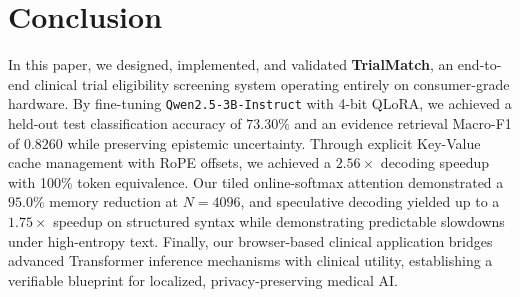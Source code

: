 \documentclass[conference]{IEEEtran}
\begin{document}
\section{Conclusion}
\label{sec:conclusion}

In this paper, we designed, implemented, and validated \textbf{TrialMatch}, an end-to-end clinical trial eligibility screening system operating entirely on consumer-grade hardware. By fine-tuning \texttt{Qwen2.5-3B-Instruct} with 4-bit QLoRA, we achieved a held-out test classification accuracy of $73.30\%$ and an evidence retrieval Macro-F1 of $0.8260$ while preserving epistemic uncertainty. Through explicit Key-Value cache management with RoPE offsets, we achieved a $2.56\times$ decoding speedup with 100\% token equivalence. Our tiled online-softmax attention demonstrated a $95.0\%$ memory reduction at $N=4096$, and speculative decoding yielded up to a $1.75\times$ speedup on structured syntax while demonstrating predictable slowdowns under high-entropy text. Finally, our browser-based clinical application bridges advanced Transformer inference mechanisms with clinical utility, establishing a verifiable blueprint for localized, privacy-preserving medical AI.

\balance



\appendices
\end{document}
